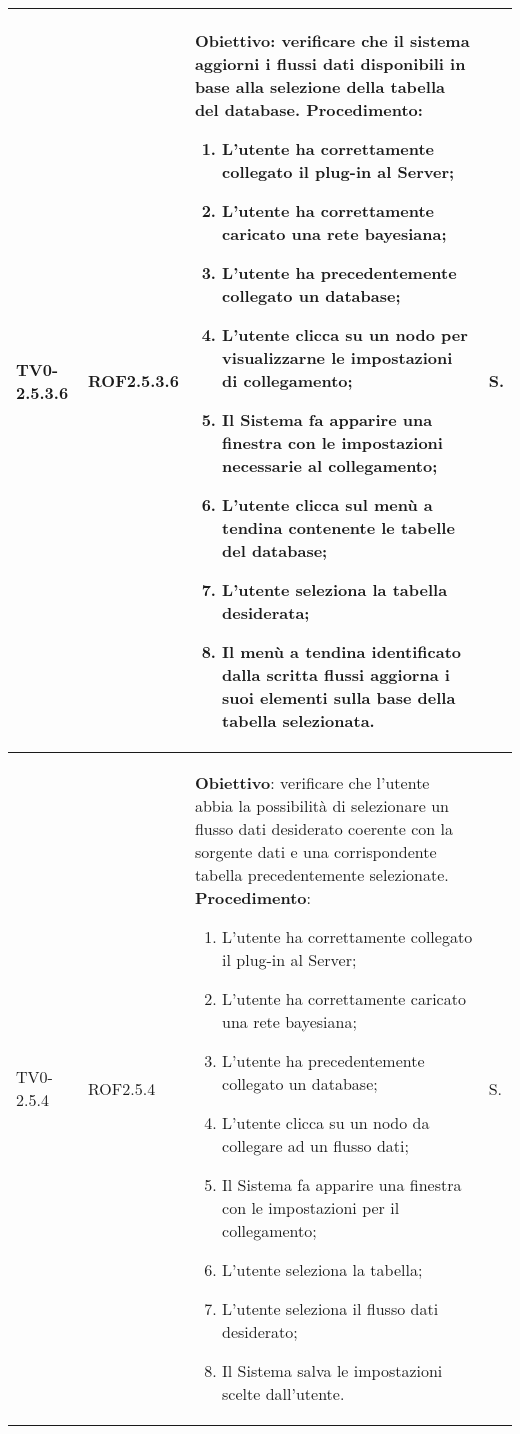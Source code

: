 \begin{longtable}{|C{.15\textwidth}|C{.13\textwidth}|m{.65\textwidth}|C{.08\textwidth}|}
TV0-2.5.3.6 & ROF2.5.3.6 &
	\textbf{Obiettivo}: verificare che il sistema aggiorni i flussi dati disponibili in base alla selezione della tabella del database. \newline
	\textbf{Procedimento}:
	\begin{enumerate}
		\item L'utente ha correttamente collegato il plug-in al Server;
		\item L'utente ha correttamente caricato una rete bayesiana;
		\item L'utente ha precedentemente collegato un database;
		\item L'utente clicca su un nodo per visualizzarne le impostazioni di collegamento;
		\item Il Sistema fa apparire una finestra con le impostazioni necessarie al collegamento;
		\item L'utente clicca sul menù a tendina contenente le tabelle del database;
		\item L'utente seleziona la tabella desiderata;
		\item Il menù a tendina identificato dalla scritta flussi aggiorna i suoi elementi sulla base della tabella selezionata.
			\end{enumerate} & S. \\
\hline

TV0-2.5.4 & ROF2.5.4 &
	\textbf{Obiettivo}: verificare che l'utente abbia la possibilità di selezionare un flusso dati desiderato coerente con la sorgente dati e  una corrispondente tabella precedentemente selezionate. \newline
	\textbf{Procedimento}:
	\begin{enumerate}
		\item L'utente ha correttamente collegato il plug-in al Server;
		\item L'utente ha correttamente caricato una rete bayesiana;
		\item L'utente ha precedentemente collegato un database;
		\item L'utente clicca su un nodo da collegare ad un flusso dati;
		\item Il Sistema fa apparire una finestra con le impostazioni per il collegamento;
		\item L'utente seleziona la tabella;
		\item L'utente seleziona il flusso dati desiderato;
		\item Il Sistema salva le impostazioni scelte dall'utente.
	\end{enumerate}
	& S. \\
\hline


\end{longtable}
